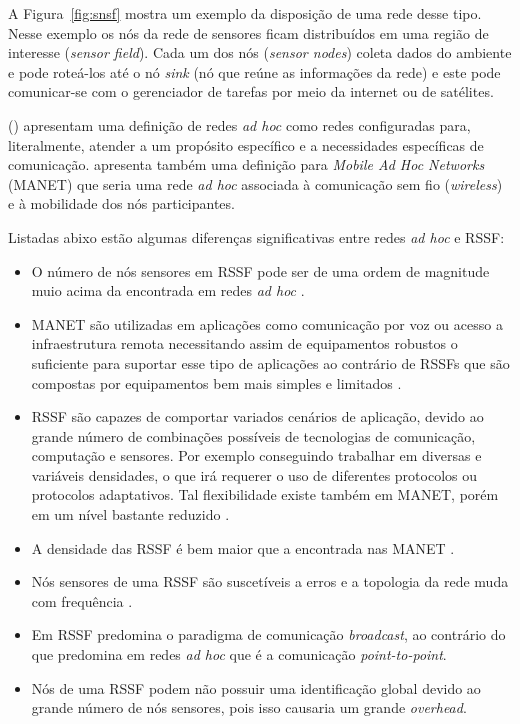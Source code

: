 A Figura~\ref{fig:snsf} mostra um exemplo da disposição de uma rede desse tipo. Nesse exemplo os nós da rede de sensores ficam distribuídos em uma região de interesse (\textit{sensor field}). Cada um dos nós (\textit{sensor nodes}) coleta dados do ambiente e pode roteá-los até o nó \textit{sink} (nó que reúne as informações da rede) e este pode comunicar-se com o gerenciador de tarefas por meio da internet ou de satélites.

 (\citeyear{Karl2005}) apresentam uma definição de redes \textit{ad hoc} como redes configuradas para, literalmente, atender a um propósito específico e a necessidades específicas de comunicação. \cite{Karl2005} apresenta também uma definição para \textit{Mobile Ad Hoc Networks} (MANET) que seria uma rede \textit{ad hoc} associada à comunicação sem fio (\textit{wireless}) e à mobilidade dos nós participantes. 


Listadas abixo estão algumas diferenças significativas entre redes \textit{ad hoc} e RSSF:
\begin{itemize} 
	\item O número de nós sensores em RSSF pode ser de uma ordem de magnitude muio acima da encontrada em redes \textit{ad hoc} \cite{Akyildiz2002}.
	\item MANET são utilizadas em aplicações como comunicação por voz ou acesso a infraestrutura remota necessitando assim de equipamentos robustos o suficiente para suportar esse tipo de aplicações ao contrário de RSSFs que são compostas por equipamentos bem mais simples e limitados \cite{Karl2005}. 
	\item RSSF são capazes de comportar variados cenários de aplicação, devido ao grande número de combinações possíveis de tecnologias de comunicação, computação e sensores. Por exemplo conseguindo trabalhar em diversas e variáveis densidades, o que irá requerer o uso de diferentes protocolos ou protocolos adaptativos. Tal flexibilidade existe também em MANET, porém em um nível bastante reduzido \cite{Karl2005}. 
	\item A densidade das RSSF é bem maior que a encontrada nas MANET \cite{Akyildiz2002}.
	\item Nós sensores de uma RSSF são suscetíveis a erros e a topologia da rede muda com frequência \cite{Akyildiz2002}. 
	\item Em RSSF predomina o paradigma de comunicação \textit{broadcast}, ao contrário do que predomina em redes \textit{ad hoc} que é a comunicação \textit{point-to-point}.
	\item Nós de uma RSSF podem não possuir uma identificação global devido ao grande número de nós sensores, pois isso causaria um grande \textit{overhead}.
\end{itemize} 

